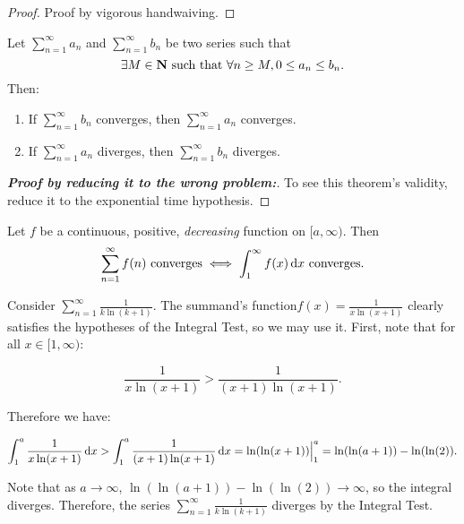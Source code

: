\documentclass{article}
\begin{document}
    \begin{proof}
      Proof by vigorous handwaiving.
    \end{proof}


    \begin{prop}
      \everymath{\displaystyle}
      \normalfont Let \(\sum_{n=1}^{\infty}a_n\) and \(\sum_{n=1}^{\infty}b_n\) be two series such that 
      \[
        \exists M \in \mathbf{N} \text{ such that } \forall n \geq M, 0 \leq a_n \leq b_n.
      \]
      \noindent
      Then:
      \begin{enumerate}
        \item If \(\sum_{n=1}^{\infty}b_n\) converges, then \(\sum_{n=1}^{\infty}a_n\) converges.
        \item If \(\sum_{n=1}^{\infty}a_n\) diverges, then \(\sum_{n=1}^{\infty}b_n\) diverges.
        \end{enumerate}
    \end{prop}

    \begin{proof}[\textbf{Proof by reducing it to the wrong problem:}] To see this theorem's validity, reduce it to the exponential time hypothesis.
    \end{proof}

    \begin{prop}
      \everymath{\displaystyle}
      Let \(f\) be a continuous, positive, \emph{decreasing} function on \([a,\infty)\). Then 
      \[
      \sum_{n=1}^{\infty}f(n) \text{ converges} \iff \int_{1}^{\infty}f(x) \, \mathrm{d} x \text{ converges}.
      \]
      \end{prop}

      {
       \everymath{\displaystyle} 
       \begin{eg}
        Consider \(\sum_{n=1}^{\infty}\frac{1}{k\ln(k+1)}\). The summand's function\(f(x) = \frac{1}{x\ln(x+1)}\) clearly satisfies the hypotheses of the Integral  Test, so we may use it. First, note that for all \(x \in [1, \infty)\):

        \[
          \frac{1}{x\ln(x+1)} > \frac{1}{(x+1)\ln(x+1)}.
        \]
       \end{eg}

       Therefore we have:

        \[
          \int_{1}^{a}\frac{1}{x\ln(x+1)} \, \mathrm{d} x > \int_{1}^{a}\frac{1}{(x+1)\ln(x+1)} \, \mathrm{d} x = \ln(\ln(x+1))\Big|_{1}^{a} = \ln(\ln(a+1)) - \ln(\ln(2)).
        \]

        Note that as \(a \to \infty\), \(\ln(\ln(a+1)) - \ln(\ln(2)) \to \infty\), so the integral diverges. Therefore, the series \(\sum_{n=1}^{\infty}\frac{1}{k\ln(k+1)}\) diverges by the Integral Test.

      }
\end{document}
